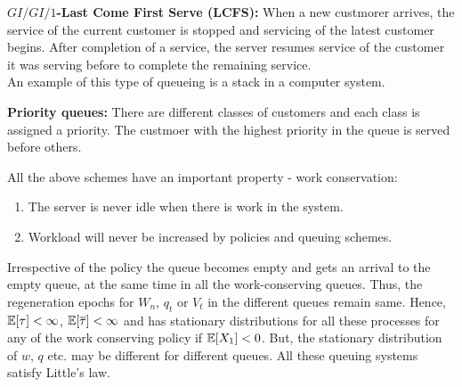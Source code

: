 \documentclass[all-lectures.tex]{subfiles}
\begin{document}
\indent \textbf{$GI/GI/1$-Last Come First Serve (LCFS):} When a new custmorer arrives, the service of the current customer is stopped and servicing of the latest customer begins. After completion of a service, the server resumes service of the customer it was serving before to complete the remaining service. \\
\indent An example of this type of queueing is a stack in a computer system.

\textbf{Priority queues:} There are different classes of customers and each class is assigned a priority. The custmoer with the highest priority in the queue is served before others. 

All  the above schemes have an important property - work conservation:
\begin{enumerate}
\item The server is never idle when there is work in the system.
\item Workload will never be increased by policies and queuing schemes. 
\end{enumerate}
\indent Irrespective of the policy the queue becomes empty and gets an arrival to the empty queue, at the same time in all the work-conserving queues. Thus, the  regeneration epochs for $W_n$, $q_t$ or $V_t$ in the different queues remain same. Hence, $\mathbb{E}[\tau]< \infty$, $\mathbb{E}[\overline{\tau}] < \infty$ and has stationary distributions for all these processes for any of the work conserving policy if $\mathbb{E}[X_1] < 0$. But, the stationary distribution of $w$, $q$ etc. may be different for different queues. All these queuing systems satisfy Little's law.

\end{document}
